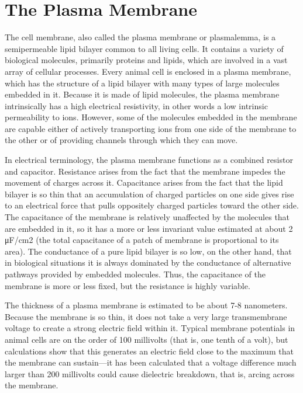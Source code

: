 \hypertarget{the-plasma-membrane}{%
\section{The Plasma Membrane}\label{the-plasma-membrane}}

The cell membrane, also called the plasma membrane or plasmalemma, is a semipermeable lipid bilayer common to all living cells. It contains a variety of biological molecules, primarily proteins and lipids, which are involved in a vast array of cellular processes.
Every animal cell is enclosed in a plasma membrane, which has the structure of a lipid bilayer with many types of large molecules embedded in it. Because it is made of lipid molecules, the plasma membrane intrinsically has a high electrical resistivity, in other words a low intrinsic permeability to ions. However, some of the molecules embedded in the membrane are capable either of actively transporting ions from one side of the membrane to the other or of providing channels through which they can move.

In electrical terminology, the plasma membrane functions as a combined resistor and capacitor. Resistance arises from the fact that the membrane impedes the movement of charges across it. Capacitance arises from the fact that the lipid bilayer is so thin that an accumulation of charged particles on one side gives rise to an electrical force that pulls oppositely charged particles toward the other side. The capacitance of the membrane is relatively unaffected by the molecules that are embedded in it, so it has a more or less invariant value estimated at about 2 μF/cm2 (the total capacitance of a patch of membrane is proportional to its area). The conductance of a pure lipid bilayer is so low, on the other hand, that in biological situations it is always dominated by the conductance of alternative pathways provided by embedded molecules. Thus, the capacitance of the membrane is more or less fixed, but the resistance is highly variable.

The thickness of a plasma membrane is estimated to be about 7-8 nanometers. Because the membrane is so thin, it does not take a very large transmembrane voltage to create a strong electric field within it. Typical membrane potentials in animal cells are on the order of 100 millivolts (that is, one tenth of a volt), but calculations show that this generates an electric field close to the maximum that the membrane can sustain---it has been calculated that a voltage difference much larger than 200 millivolts could cause dielectric breakdown, that is, arcing across the membrane.


